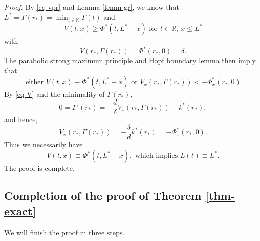 \documentclass[11pt]{amsart}
\numberwithin{equation}{section}
\begin{document}
\begin{proof}
  By \eqref{eq-vpr} and  Lemma \ref{lemm-gr}, we know that $L^*=\Gamma(r_*)=\min_{t\in\mathbb R} \Gamma(t)$ and 
  \begin{equation*}
    V(t,x)\geq \Phi^*(t,L^*-x) \text{ for }t\in\mathbb{R},\ x\leq L^*
  \end{equation*}
  with 
  \begin{equation*}
    V(r_*,\Gamma(r_*))=\Phi^*(r_*,0)=\delta.
  \end{equation*}
 The parabolic strong maximum principle and Hopf boundary lemma then imply that
  \begin{equation*}
    \text{ either } V(t,x)\equiv \Phi^*(t,L^*-x) \text{ or } V_x(r_*,\Gamma(r_*))<-\Phi^*_x(r_*,0).
  \end{equation*} 
 By  \eqref{eq-V} and the minimality of $\Gamma(r_*)$, 
  \begin{equation*}
   0= \Gamma'(r_*)=-\frac{d}{\delta}V_x(r_*,\Gamma(r_*))-k^*(r_*),
  \end{equation*}
  and hence, 
  \begin{equation*}
    V_x(r_*,\Gamma(r_*))=-\frac{\delta}{d}k^*(r_*)=-\Phi_x^*(r_*,0).
  \end{equation*}
  Thus we necessarily have 
  \begin{equation}\label{eq-vp}
    V(t,x)\equiv \Phi^*(t,L^*-x), \text{ which implies }L(t)\equiv L^*. 
  \end{equation}
  The proof is complete.
\end{proof}
\subsection{Completion of the proof of Theorem \ref{thm-exact}}
We will finish the proof in three steps.\medskip
\end{document}

